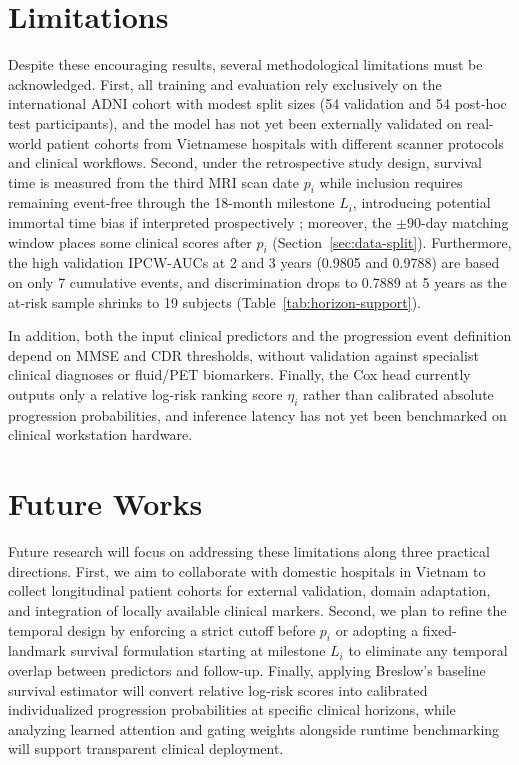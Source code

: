 \section{Limitations}
\label{sec:study-limitations}
Despite these encouraging results, several methodological limitations must be acknowledged. First, all training and evaluation rely exclusively on the international ADNI cohort with modest split sizes (54 validation and 54 post-hoc test participants), and the model has not yet been externally validated on real-world patient cohorts from Vietnamese hospitals with different scanner protocols and clinical workflows. Second, under the retrospective study design, survival time is measured from the third MRI scan date $p_i$ while inclusion requires remaining event-free through the 18-month milestone $L_i$, introducing potential immortal time bias if interpreted prospectively \cite{suissa2008immortal}; moreover, the $\pm90$-day matching window places some clinical scores after $p_i$ (Section~\ref{sec:data-split}). Furthermore, the high validation IPCW-AUCs at 2 and 3 years (0.9805 and 0.9788) are based on only 7 cumulative events, and discrimination drops to 0.7889 at 5 years as the at-risk sample shrinks to 19 subjects (Table~\ref{tab:horizon-support}).

In addition, both the input clinical predictors and the progression event definition depend on MMSE and CDR thresholds, without validation against specialist clinical diagnoses or fluid/PET biomarkers. Finally, the Cox head currently outputs only a relative log-risk ranking score $\eta_i$ rather than calibrated absolute progression probabilities, and inference latency has not yet been benchmarked on clinical workstation hardware.

\section{Future Works}
Future research will focus on addressing these limitations along three practical directions. First, we aim to collaborate with domestic hospitals in Vietnam to collect longitudinal patient cohorts for external validation, domain adaptation, and integration of locally available clinical markers. Second, we plan to refine the temporal design by enforcing a strict cutoff before $p_i$ or adopting a fixed-landmark survival formulation starting at milestone $L_i$ \cite{vanhouwelingen2007dynamic} to eliminate any temporal overlap between predictors and follow-up. Finally, applying Breslow's baseline survival estimator \cite{kvamme2019time} will convert relative log-risk scores into calibrated individualized progression probabilities at specific clinical horizons, while analyzing learned attention and gating weights alongside runtime benchmarking will support transparent clinical deployment.
